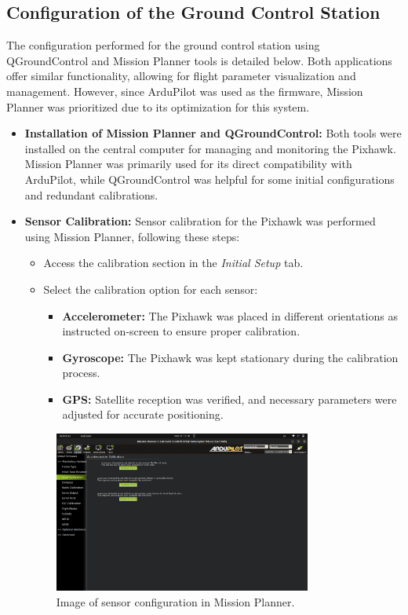 \subsection{Configuration of the Ground Control Station} 
The configuration performed for the ground control station using QGroundControl and Mission Planner tools is detailed below. Both applications offer similar functionality, allowing for flight parameter visualization and management. However, since ArduPilot was used as the firmware, Mission Planner was prioritized due to its optimization for this system.
    
\begin{itemize}
    \item \textbf{Installation of Mission Planner and QGroundControl:} 
    Both tools were installed on the central computer for managing and monitoring the Pixhawk. Mission Planner was primarily used for its direct compatibility with ArduPilot, while QGroundControl was helpful for some initial configurations and redundant calibrations.
    
    \item \textbf{Sensor Calibration:} 
    Sensor calibration for the Pixhawk was performed using Mission Planner, following these steps:
    \begin{itemize}
        \item Access the calibration section in the \textit{Initial Setup} tab.
        \item Select the calibration option for each sensor:
        \begin{itemize}
            \item \textbf{Accelerometer:} The Pixhawk was placed in different orientations as instructed on-screen to ensure proper calibration.
            \item \textbf{Gyroscope:} The Pixhawk was kept stationary during the calibration process.
            \item \textbf{GPS:} Satellite reception was verified, and necessary parameters were adjusted for accurate positioning.
        \end{itemize}
    \end{itemize}
    \begin{figure}[H]
        \centering
        \includegraphics[width=0.8\textwidth]{pictures/mp_calibration.png}
        \caption{Image of sensor configuration in Mission Planner.}
    \end{figure}


\end{itemize}
